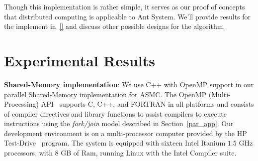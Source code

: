 \documentclass[11pt]{article}
\begin{document}
Though this implementation is rather simple, it serves as our proof of concepts that distributed computing is applicable to Ant System.  We'll provide results for the implement in~\ref{} and discuss other possible designs for the algorithm.



\section{Experimental Results}\label{results} %




\textbf{Shared-Memory implementation}: We use C++ with OpenMP support in our parallel Shared-Memory implementation for ASMC. The OpenMP (Multi-Processing) API~\cite{OpenMP} supports C, C++, and FORTRAN in all platforms and consists of compiler directives and library functions to assist compilers to execute instructions using the \textit{fork/join} model described in Section~\ref{par_app}.  Our development environment is on a multi-processor computer provided by the HP Test-Drive~\cite{HP_Testdrive} program. The system is equipped with sixteen Intel Itanium $1.5$ GHz processors, with $8$ GB of Ram, running Linux with the Intel Compiler suite. 
\end{document}
